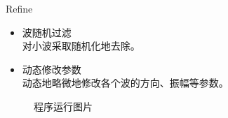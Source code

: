 \documentclass[handout,t]{beamer}
\begin{document}
\begin{frame}{Refine}
  \begin{itemize}
    \item 波随机过滤\\
    对小波采取随机化地去除。
    \item 动态修改参数\\
    动态地略微地修改各个波的方向、振幅等参数。
  \end{itemize}

  \begin{figure}[thpb]
    \centering
  \caption{程序运行图片}\label{fig:show}
  \end{figure}


\end{frame}





\end{document}
